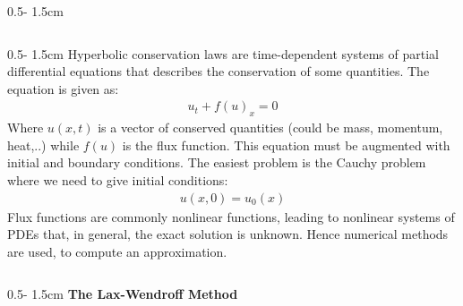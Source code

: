 \documentclass{uibposter}
\begin{document}
\begin{frame}[fragile]
\begin{columns}
\begin{column}{0.5\textwidth - 1.5cm}
\begin{column}{0.5\textwidth - 1.5cm}
Hyperbolic conservation laws are time-dependent systems of partial differential equations that describes the conservation of some quantities. The equation is given as:
\begin{align*}
u_t + f(u)_x = 0
\end{align*}
Where $u(x,t)$ is a vector of conserved quantities (could be mass, momentum, heat,..) while $f(u)$ is the flux function.
This equation must be augmented with initial and boundary conditions. The easiest problem is the Cauchy problem where we need to give initial conditions:
\begin{align*}
u(x, 0) = u_0(x)
\end{align*}
Flux functions are commonly nonlinear functions, leading to nonlinear systems of PDEs that, in general, the exact solution is unknown. Hence numerical methods are used, to compute an approximation.

\end{column}
\begin{column}{0.5\textwidth - 1.5cm}
\textbf{The Lax-Wendroff Method}
\vspace{-1cm}


\end{column}
\end{column}
\end{columns}
\end{frame}
\end{document}

